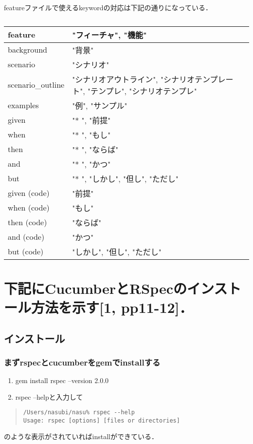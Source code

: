 featureファイルで使えるkeywordの対応は下記の通りになっている．

\begin{table}[htbp]\begin{center}
\caption{}
\begin{tabular}{lll}
\hline
feature  &"フィーチャ", "機能"     \\ \hline
background  &"背景"              \\
scenario  &"シナリオ"            \\
scenario\_outline   &"シナリオアウトライン", "シナリオテンプレート", "テンプレ", "シナリオテンプレ"   \\
examples  &"例", "サンプル"       \\
given   &"* ", "前提"        \\
when   &"* ", "もし"        \\
then   &"* ", "ならば"       \\
and    &"* ", "かつ"        \\
but    &"* ", "しかし", "但し", "ただし"  \\
given (code)   &"前提"              \\
when (code)   &"もし"              \\
then (code)   &"ならば"             \\
and (code)    &"かつ"              \\
but (code)    &"しかし", "但し", "ただし"   \\
\hline
\end{tabular}
\label{default}
\end{center}\end{table}

\section{下記にCucumberとRSpecのインストール方法を示す[1, pp11-12]．}
\subsection{インストール}
\subsubsection{まずrspecとcucumberをgemでinstallする}
\begin{enumerate}
\item gem install rspec --version 2.0.0
\item rspec --helpと入力して
\end{enumerate}\begin{quote}\begin{verbatim}
/Users/nasubi/nasu% rspec --help
Usage: rspec [options] [files or directories]
\end{verbatim}\end{quote}
のような表示がされていればinstallができている．

